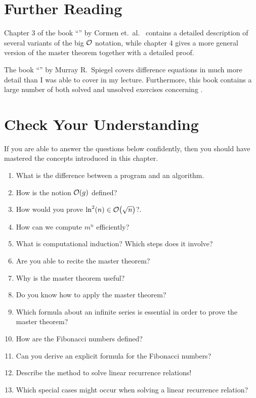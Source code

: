 \section{Further Reading}
Chapter 3 of the book ``'' by Cormen et.~al.~\cite{cormen:09}
contains a detailed description of several variants of the big $\mathcal{O}$ notation, while
chapter 4 gives a more general version of the master theorem together with a detailed proof.

The book ``'' by Murray R.~Spiegel
\cite{spiegel:1971} covers difference equations in much more detail than I was able to cover in my lecture.
Furthermore, this book contains a large number of both solved and unsolved exercises concerning
. 

\section{Check Your Understanding}
If you are able to answer the questions below confidently, then you should have mastered the concepts
introduced in this chapter.
\begin{enumerate}
\item What is the difference between a program and an algorithm.
\item How is the notion $\mathcal{O}(g)$ defined?
\item How would you prove $\ln^2(n) \in \mathcal{O}\bigl(\sqrt{n}\bigr)$?.
\item How can we compute $m^n$ efficiently?
\item What is computational induction?  Which steps does it involve?
\item Are you able to recite the master theorem?
\item Why is the master theorem useful?
\item Do you know how to apply the master theorem?
\item Which formula about an infinite series is essential in order to prove the master theorem?
\item How are the Fibonacci numbers defined?
\item Can you derive an explicit formula for the Fibonacci numbers?
\item Describe the method to solve linear recurrence relations!
\item Which special cases might occur when solving a linear recurrence relation?
\end{enumerate}


